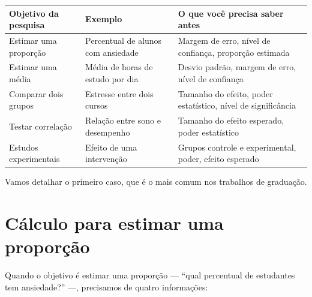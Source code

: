 \documentclass[
]{book}
\newcounter{none} %
\begin{document}
{\def\LTcaptype{none} %
\begin{longtable}[]{@{}
  >{\raggedright\arraybackslash}p{}
  >{\raggedright\arraybackslash}p{}
  >{\raggedright\arraybackslash}p{}@{}}
\toprule\noalign{}
\begin{minipage}[b]{\linewidth}\raggedright
Objetivo da pesquisa
\end{minipage} & \begin{minipage}[b]{\linewidth}\raggedright
Exemplo
\end{minipage} & \begin{minipage}[b]{\linewidth}\raggedright
O que você precisa saber antes
\end{minipage} \\
\midrule\noalign{}
\endhead
\bottomrule\noalign{}
\endlastfoot
Estimar uma proporção & Percentual de alunos com ansiedade & Margem de erro, nível de confiança, proporção estimada \\
Estimar uma média & Média de horas de estudo por dia & Desvio padrão, margem de erro, nível de confiança \\
Comparar dois grupos & Estresse entre dois cursos & Tamanho do efeito, poder estatístico, nível de significância \\
Testar correlação & Relação entre sono e desempenho & Tamanho do efeito esperado, poder estatístico \\
Estudos experimentais & Efeito de uma intervenção & Grupos controle e experimental, poder, efeito esperado \\
\end{longtable}
}

Vamos detalhar o primeiro caso, que é o mais comum nos trabalhos de graduação.

\section{Cálculo para estimar uma proporção}\label{cuxe1lculo-para-estimar-uma-proporuxe7uxe3o}

Quando o objetivo é estimar uma proporção --- ``qual percentual de estudantes tem ansiedade?'' ---, precisamos de quatro informações:
\end{document}
